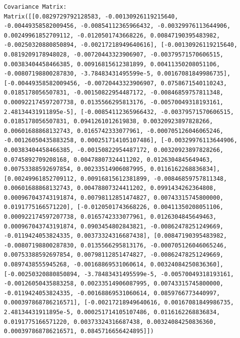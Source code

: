 \documentclass[
  letterpaper,
  DIV=11,
  numbers=noendperiod]{scrreprt}
\theoremstyle{plain}
\theoremstyle{definition}
\theoremstyle{remark}
\begin{document}
\begin{verbatim}
Covariance Matrix:
Matrix([[0.0829729792128583, -0.00130926119215640, -0.00449358582009456, -0.00854112365966432, -0.00329976113644906, 0.00249961852709112, -0.0120501743668226, 0.00847190395483982, -0.00250320880850894, -0.00217218949640616], [-0.00130926119215640, 0.0819209178948028, -0.00720443323906907, -0.00379571570606515, 0.00383404458466385, 0.00916815612381899, 0.00411350208051106, -0.00807198800287830, -3.78483431495599e-5, 0.00167081849986735], [-0.00449358582009456, -0.00720443323906907, 0.0758671540110243, 0.0185178056507831, -0.00150822954487172, -0.00846859757811348, 0.000922174597207738, 0.0135566295813176, -0.00570049318193161, 2.48134431911895e-5], [-0.00854112365966432, -0.00379571570606515, 0.0185178056507831, 0.0941261012619838, 0.00320923897828266, 0.00601688868132743, 0.0165742333077961, -0.000705126046065246, -0.00126050435883258, 0.000251714105107486], [-0.00329976113644906, 0.00383404458466385, -0.00150822954487172, 0.00320923897828266, 0.0745892709208168, 0.00478807324411202, 0.0126304845649463, 0.00753388592697854, 0.00233514906087995, 0.0116162268836834], [0.00249961852709112, 0.00916815612381899, -0.00846859757811348, 0.00601688868132743, 0.00478807324411202, 0.0991434262364808, 0.000967043743191874, 0.00798112851474827, 0.00743315745800000, 0.0191775166571220], [-0.0120501743668226, 0.00411350208051106, 0.000922174597207738, 0.0165742333077961, 0.0126304845649463, 0.000967043743191874, 0.0903454802843821, -0.00862478251249669, -0.0119424053824335, 0.00373324316687438], [0.00847190395483982, -0.00807198800287830, 0.0135566295813176, -0.000705126046065246, 0.00753388592697854, 0.00798112851474827, -0.00862478251249669, 0.0897438555945268, -0.00168869531060614, 0.00324084250836360], [-0.00250320880850894, -3.78483431495599e-5, -0.00570049318193161, -0.00126050435883258, 0.00233514906087995, 0.00743315745800000, -0.0119424053824335, -0.00168869531060614, 0.0859766773440997, 0.000397868786216571], [-0.00217218949640616, 0.00167081849986735, 2.48134431911895e-5, 0.000251714105107486, 0.0116162268836834, 0.0191775166571220, 0.00373324316687438, 0.00324084250836360, 0.000397868786216571, 0.0845716656424895]])


\end{verbatim}
\end{document}
